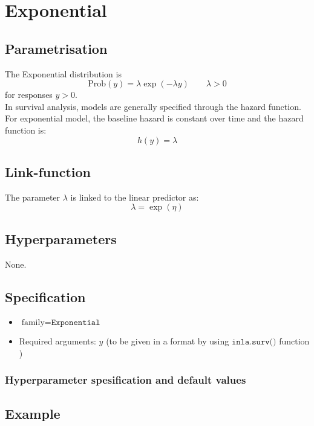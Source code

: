 \documentclass[a4paper,11pt]{article}
\begin{document}
\section*{Exponential}

\subsection*{Parametrisation}

The Exponential distribution is
\begin{displaymath}
    \text{Prob}(y) = \lambda \exp(-\lambda y)\qquad \lambda > 0
\end{displaymath}
for responses $y>0$.\\
In survival analysis, models are generally specified through the
hazard function. For exponential model, the baseline hazard is
constant over time and the hazard function is:
\begin{displaymath}
    h(y)  = \lambda
\end{displaymath}

\subsection*{Link-function}
The parameter $\lambda$ is linked to the linear predictor as:
\[
\lambda = \exp(\eta)
\]

\subsection*{Hyperparameters}

None.

\subsection*{Specification}

\begin{itemize}
\item $\text{family}=\texttt{Exponential}$
\item Required arguments: $y$ (to be given in a format by using
    $\texttt{inla.surv()}$ function )
\end{itemize}

\subsubsection*{Hyperparameter spesification and default values}



\subsection*{Example}
\end{document}

